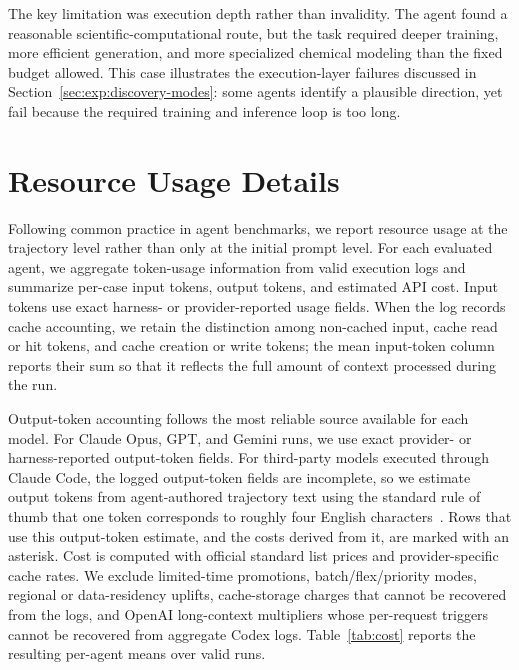 \documentclass{llmxive}
\begin{document}
The key limitation was execution depth rather than invalidity. The agent found a reasonable scientific-computational route, but the task required deeper training, more efficient generation, and more specialized chemical modeling than the fixed budget allowed. This case illustrates the execution-layer failures discussed in Section~\ref{sec:exp:discovery-modes}: some agents identify a plausible direction, yet fail because the required training and inference loop is too long.




\section{Resource Usage Details}
\label{app:cost}


Following common practice in agent benchmarks, we report resource usage at the trajectory level rather than only at the initial prompt level. For each evaluated agent, we aggregate token-usage information from valid execution logs and summarize per-case input tokens, output tokens, and estimated API cost. Input tokens use exact harness- or provider-reported usage fields. When the log records cache accounting, we retain the distinction among non-cached input, cache read or hit tokens, and cache creation or write tokens; the mean input-token column reports their sum so that it reflects the full amount of context processed during the run.

Output-token accounting follows the most reliable source available for each model. For Claude Opus, GPT, and Gemini runs, we use exact provider- or harness-reported output-token fields. For third-party models executed through Claude Code, the logged output-token fields are incomplete, so we estimate output tokens from agent-authored trajectory text using the standard rule of thumb that one token corresponds to roughly four English characters~\citep{openai2026tokens,anthropic2026pricing}. Rows that use this output-token estimate, and the costs derived from it, are marked with an asterisk. Cost is computed with official standard list prices and provider-specific cache rates. We exclude limited-time promotions, batch/flex/priority modes, regional or data-residency uplifts, cache-storage charges that cannot be recovered from the logs, and OpenAI long-context multipliers whose per-request triggers cannot be recovered from aggregate Codex logs.
Table~\ref{tab:cost} reports the resulting per-agent means over valid runs.
\end{document}
